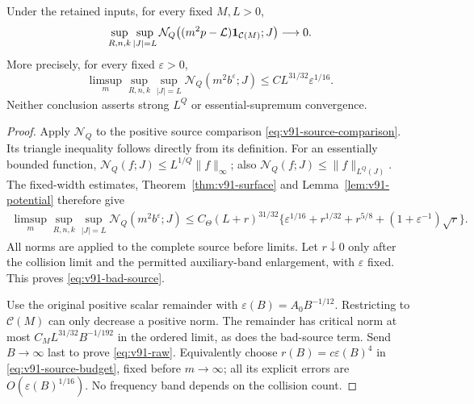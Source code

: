 \begin{theorem}
\label{thm:v91-raw}
Under the retained inputs, for every fixed $M,L>0$,
\begin{equation}\label{eq:v91-raw}
 \sup_{R,n,k}\sup_{|J|=L}
 \mathcal N_Q\bigl((m^2p-\mathcal L)\one_{\mathcal C(M)};J\bigr)
                                      \longrightarrow0.
\end{equation}
More precisely, for every fixed $\varepsilon>0$,
\begin{equation}\label{eq:v91-bad-source}
 \limsup_m\sup_{R,n,k}\sup_{|J|=L}
       \mathcal N_Q(m^2b^\varepsilon;J)
                         \le C L^{31/32}\varepsilon^{1/16}.
\end{equation}
Neither conclusion asserts strong $L^Q$ or essential-supremum
convergence.
\end{theorem}
\begin{proof}
Apply $\mathcal N_Q$ to the positive source comparison
\eqref{eq:v91-source-comparison}. Its triangle inequality follows
directly from its definition. For an essentially bounded function,
$\mathcal N_Q(f;J)\le L^{1/Q}\|f\|_\infty$; also
$\mathcal N_Q(f;J)\le\|f\|_{L^Q(J)}$. The fixed-width estimates,
Theorem~\ref{thm:v91-surface} and Lemma~\ref{lem:v91-potential}
therefore give
\begin{align}
 \limsup_m\sup_{R,n,k}\sup_{|J|=L}
       \mathcal N_Q(m^2b^\varepsilon;J)
 \le C_\Theta(L+r)^{31/32}
  \{\varepsilon^{1/16}+r^{1/32}+r^{5/8}
                       +(1+\varepsilon^{-1})\sqrt r\}.
 \label{eq:v91-source-budget}
\end{align}
All norms are applied to the complete source before limits.
Let $r\downarrow0$ only after the collision limit and the permitted
auxiliary-band enlargement, with $\varepsilon$ fixed. This proves
\eqref{eq:v91-bad-source}.

Use the original positive scalar remainder with
$\varepsilon(B)=A_0B^{-1/12}$. Restricting to $\mathcal C(M)$
can only decrease a positive norm. The remainder has critical norm
at most $C_M L^{31/32}B^{-1/192}$ in the ordered limit, as does
the bad-source term. Send $B\to\infty$ last to prove
\eqref{eq:v91-raw}. Equivalently choose $r(B)=c\varepsilon(B)^4$
in \eqref{eq:v91-source-budget}, fixed before $m\to\infty$;
all its explicit errors are $O(\varepsilon(B)^{1/16})$.
No frequency band depends on the collision count.
\end{proof}

